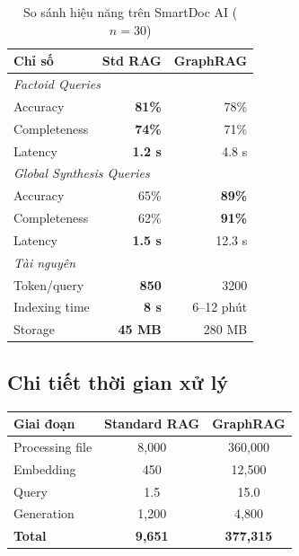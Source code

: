 \documentclass[10pt, conference, a4paper]{IEEEtran}
\begin{document}
\begin{table}[h]
\centering
\caption{So sánh hiệu năng trên SmartDoc AI ($n=30$)}
\begin{tabular}{@{}lrr@{}}
\toprule
\textbf{Chỉ số} & \textbf{Std RAG} & \textbf{GraphRAG} \\
\midrule
\multicolumn{3}{l}{\textit{Factoid Queries}} \\
Accuracy        & \textbf{81\%} & 78\% \\
Completeness    & \textbf{74\%} & 71\% \\
Latency         & \textbf{1.2 s} & 4.8 s \\
\midrule
\multicolumn{3}{l}{\textit{Global Synthesis Queries}} \\
Accuracy        & 65\% & \textbf{89\%} \\
Completeness    & 62\% & \textbf{91\%} \\
Latency         & \textbf{1.5 s} & 12.3 s \\
\midrule
\multicolumn{3}{l}{\textit{Tài nguyên}} \\
Token/query     & \textbf{850} & 3200 \\
Indexing time   & \textbf{8 s} & 6--12 phút \\
Storage         & \textbf{45 MB} & 280 MB \\
\bottomrule
\end{tabular}
\label{tab:results}
\end{table}

\subsection{Chi tiết thời gian xử lý}

\begin{center}
\label{tab:breakdown}
\begin{tabular}{@{}lcc@{}}
\toprule
\textbf{Giai đoạn} & \textbf{Standard RAG} & \textbf{GraphRAG} \\
\midrule
Processing file & 8,000 & 360,000 \\
Embedding & 450 & 12,500 \\
Query & 1.5 & 15.0 \\
Generation & 1,200 & 4,800 \\
\textbf{Total} & \textbf{9,651} & \textbf{377,315} \\
\bottomrule
\end{tabular}
\end{center}
\end{document}
